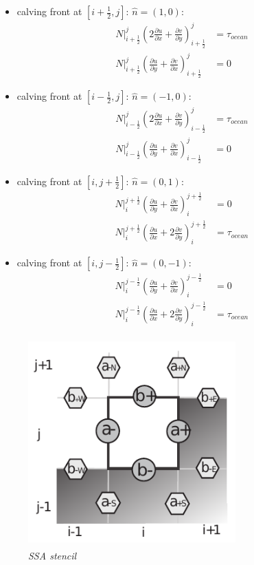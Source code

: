 \documentclass[a4paper,10pt]{article}
\begin{document}
\begin{itemize} 
\item calving front at $[i+\frac{1}{2},j]$: $\hat{n}=(1,0)$: 
\begin{align}
N|_{i+\frac{1}{2}}^j\left(2\frac{\partial u}{\partial x} + \frac{\partial v}{\partial y} \right)_{i+\frac{1}{2}}^j &= \tau_{ocean} \nonumber \\
N|_{i+\frac{1}{2}}^j\left(\frac{\partial u}{\partial y} + \frac{\partial v}{\partial x} \right)_{i+\frac{1}{2}}^j &= 0
\end{align}
\item calving front at $[i-\frac{1}{2},j]$: $\hat{n}=(-1,0)$: 
\begin{align}
N|_{i-\frac{1}{2}}^j\left(2\frac{\partial u}{\partial x} + \frac{\partial v}{\partial y} \right)_{i-\frac{1}{2}}^j &= \tau_{ocean} \nonumber \\
N|_{i-\frac{1}{2}}^j\left(\frac{\partial u}{\partial y} + \frac{\partial v}{\partial x} \right)_{i-\frac{1}{2}}^j &= 0
\end{align}
\item calving front at $[i,j+\frac{1}{2}]$: $\hat{n}=(0,1)$: 
\begin{align}
N|_{i}^{j+\frac{1}{2}}\left(\frac{\partial u}{\partial y} + \frac{\partial v}{\partial x} \right)_{i}^{j+\frac{1}{2}} &= 0 \nonumber \\
N|_{i}^{j+\frac{1}{2}}\left(\frac{\partial u}{\partial x} + 2\frac{\partial v}{\partial y} \right)_{i}^{j+\frac{1}{2}} &= \tau_{ocean}
\end{align}
\item calving front at $[i,j-\frac{1}{2}]$: $\hat{n}=(0,-1)$: 
\begin{align}
N|_{i}^{j-\frac{1}{2}}\left(\frac{\partial u}{\partial y} + \frac{\partial v}{\partial x} \right)_{i}^{j-\frac{1}{2}} &= 0 \nonumber \\
N|_{i}^{j-\frac{1}{2}}\left(\frac{\partial u}{\partial x} + 2\frac{\partial v}{\partial y} \right)_{i}^{j-\frac{1}{2}} &= \tau_{ocean}
\end{align}
\end{itemize}
\begin{figure}[htb]
\begin{center}
\includegraphics[height=80mm, width=8cm]{f07.pdf}
\caption{\emph{SSA stencil}}
\label{result3}
\end{center}
\end{figure}
\end{document}
